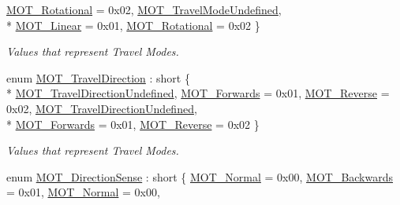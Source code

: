 \begin{DoxyCompactItemize}
\hyperlink{group___common_gga6ba6123918e8f35d6fef7daf9dbd11d4a61adb90b042f53820ab0c228b61834d7}{M\+O\+T\+\_\+\+Rotational} = 0x02, 
\hyperlink{group___common_gga6ba6123918e8f35d6fef7daf9dbd11d4abbde058aa7397580f982fce0c6dbde78}{M\+O\+T\+\_\+\+Travel\+Mode\+Undefined}, 
\\*
\hyperlink{group___common_gga6ba6123918e8f35d6fef7daf9dbd11d4a51e3be0b3b203122cc8860458ab2f2ca}{M\+O\+T\+\_\+\+Linear} = 0x01, 
\hyperlink{group___common_gga6ba6123918e8f35d6fef7daf9dbd11d4a61adb90b042f53820ab0c228b61834d7}{M\+O\+T\+\_\+\+Rotational} = 0x02
 \}\begin{DoxyCompactList}\small\item\em Values that represent Travel Modes. \end{DoxyCompactList}
\item 
enum \hyperlink{group___common_ga70a2a2ac296464f3d846c30d71d18daa}{M\+O\+T\+\_\+\+Travel\+Direction} \+: short \{ \\*
\hyperlink{group___common_gga70a2a2ac296464f3d846c30d71d18daaaf643e125179354cc673e0644ce015703}{M\+O\+T\+\_\+\+Travel\+Direction\+Undefined}, 
\hyperlink{group___common_gga70a2a2ac296464f3d846c30d71d18daaacb8d98775e587f29a0328a5875b092cd}{M\+O\+T\+\_\+\+Forwards} = 0x01, 
\hyperlink{group___common_gga70a2a2ac296464f3d846c30d71d18daaa6b9608a57ff49d06b450236c54dd5b76}{M\+O\+T\+\_\+\+Reverse} = 0x02, 
\hyperlink{group___common_gga70a2a2ac296464f3d846c30d71d18daaaf643e125179354cc673e0644ce015703}{M\+O\+T\+\_\+\+Travel\+Direction\+Undefined}, 
\\*
\hyperlink{group___common_gga70a2a2ac296464f3d846c30d71d18daaacb8d98775e587f29a0328a5875b092cd}{M\+O\+T\+\_\+\+Forwards} = 0x01, 
\hyperlink{group___common_gga70a2a2ac296464f3d846c30d71d18daaa6b9608a57ff49d06b450236c54dd5b76}{M\+O\+T\+\_\+\+Reverse} = 0x02
 \}\begin{DoxyCompactList}\small\item\em Values that represent Travel Modes. \end{DoxyCompactList}
\item 
enum \hyperlink{group___common_ga8e20138f47b000995f254ee6262f89d8}{M\+O\+T\+\_\+\+Direction\+Sense} \+: short \{ \hyperlink{group___common_gga8e20138f47b000995f254ee6262f89d8a97191fb7d9f28808868a1e52c4365bd3}{M\+O\+T\+\_\+\+Normal} = 0x00, 
\hyperlink{group___common_gga8e20138f47b000995f254ee6262f89d8a8e02e9b2bcad41ba25f2295821acd453}{M\+O\+T\+\_\+\+Backwards} = 0x01, 
\hyperlink{group___common_gga8e20138f47b000995f254ee6262f89d8a97191fb7d9f28808868a1e52c4365bd3}{M\+O\+T\+\_\+\+Normal} = 0x00, 

\end{DoxyCompactItemize}
